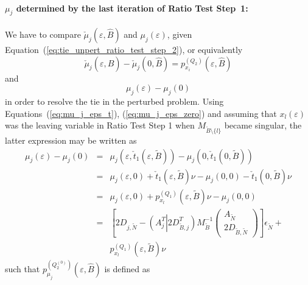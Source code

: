 \documentclass[a4paper]{article}
\newcommand{\pmu}[2]{\ensuremath{p_{\mu_{j}}^{(#1)}(\varepsilon, #2)}}
\begin{document}
\paragraph{$\mu_{j}$ determined by the last iteration of Ratio Test Step~1:}
We have to compare $\check{\mu}_{j}(\varepsilon, \hat{B})$ and
$\mu_{j}(\varepsilon)$, given Equation~(\ref{eq:tie_unpert_ratio_test_step_2}),
or equivalently
\begin{equation*}
  \check{\mu}_{j}(\varepsilon, \hat{B}) -
  \check{\mu}_{j}(0, \hat{B})= p_{x_{i}}^{(Q_{2})}(\varepsilon, \hat{B})
\end{equation*}
and
\begin{equation*}
\mu_{j}\left(\varepsilon\right) - \mu_{j}\left(0\right)
\end{equation*}
in order to resolve the tie in the perturbed problem.
Using Equations~(\ref{eq:mu_j_eps_t}), (\ref{eq:mu_j_eps_zero}) and assuming
that $x_{l}(\varepsilon)$ was the leaving variable in Ratio Test Step 1
when $M_{\tilde{B} \setminus \{l\}}$ became singular, the latter expression
may be written as
\begin{eqnarray*}
  \mu_{j}\left(\varepsilon\right) - \mu_{j}\left(0\right) &=&
  \mu_{j}(\varepsilon, \check{t}_{1}(\varepsilon, \tilde{B})) -
  \mu_{j}(0, \check{t}_{1}(0, \tilde{B})) \\
  &=&
  \mu_{j}\left(\varepsilon, 0\right) +
  \check{t}_{1}(\varepsilon, \tilde{B})\nu -
  \mu_{j}\left(0, 0\right) -
  \check{t}_{1}(0, \tilde{B})\nu \\
  &=&
  \mu_{j}\left(\varepsilon,0\right)
  +p_{x_{l}}^{(Q_{1})}(\varepsilon, \tilde{B})\nu -
  \mu_{j}(0, 0) \\
  &=&
  \left[
      2D_{j, \tilde{N}}
        -\left(A_{j}^{T} \left| \right. 2D_{\tilde{B}, j}^{T} \right)
      M_{\tilde{B}}^{-1}
      \left(\begin{array}{c}
              A_{\tilde{N}} \\
	      \hline
	      2D_{\tilde{B}, \tilde{N}}
	    \end{array}
      \right)
   \right]\epsilon_{\tilde{N}} + \\
   && p_{x_{l}}^{(Q_{1})}(\varepsilon, \tilde{B})\nu
\end{eqnarray*}
such that \pmu{Q_{2}^{(0)}}{\hat{B}} is defined as
\end{document}
